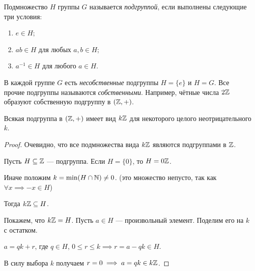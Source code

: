 \begin{definition}
    Подмножество $H$ группы $G$ называется \textit{подгруппой}, если выполнены следующие три условия:
    \begin{enumerate}[nosep]
    \item $e \in H$;
    \item $ab \in H$ для любых $a, b \in H$;
    \item $a^{-1} \in H$ для любого $a \in H$.
    \end{enumerate}
\end{definition}

В каждой группе $G$ есть \textit{несобственные} подгруппы $H = \{e\}$ и $H = G$. Все прочие подгруппы называются \textit{собственными}. Например, чётные числа $2\mathbb{Z}$ образуют собственную подгруппу в $(\mathbb{Z}, +)$.

\begin{proposal}
    Всякая подгруппа в $(\mathbb{Z}, +)$ имеет вид $k\mathbb{Z}$ для некоторого целого неотрицательного $k$.
\end{proposal}

\begin{proof}
    Очевидно, что все подмножества вида $k\mathbb{Z}$ являются подгруппами в $\mathbb{Z}$.

    Пусть $H \subseteq \mathbb{Z}$ --- подгруппа. Если $H = \{0\}$, то $H = 0\mathbb{Z}$.
    
    Иначе положим $k = \min(H \cap \mathbb{N}) \neq 0$. (это множество непусто, так как $\forall x \implies -x \in H$)

    Тогда $k\mathbb{Z} \subseteq H$.

    Покажем, что $k\mathbb{Z} = H$. Пусть $a \in H$ --- произвольный элемент. Поделим его на $k$ с остатком.

    $a = qk + r$, где $q \in H$, $0 \leq r \leq k \implies r = a - qk \in H$.

    В силу выбора $k$ получаем $r = 0 \implies a = qk \in k \mathbb{Z}$.
\end{proof}
